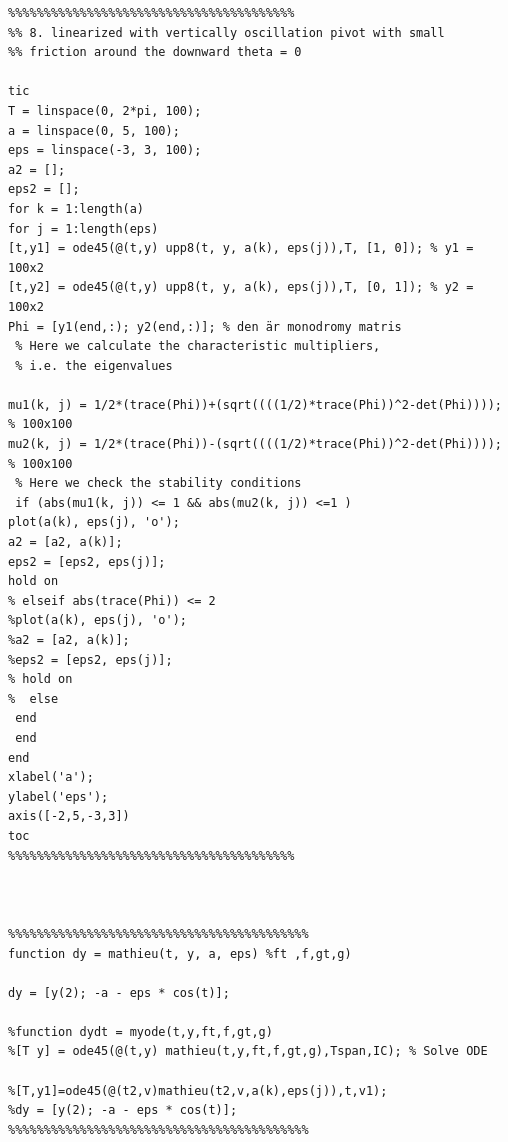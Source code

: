 \documentclass{article}
\begin{document}
\begin{verbatim}
%%%%%%%%%%%%%%%%%%%%%%%%%%%%%%%%%%%%%%%%
%% 8. linearized with vertically oscillation pivot with small 
%% friction around the downward theta = 0

tic
T = linspace(0, 2*pi, 100);
a = linspace(0, 5, 100);
eps = linspace(-3, 3, 100);
a2 = [];
eps2 = [];
for k = 1:length(a)
for j = 1:length(eps)
[t,y1] = ode45(@(t,y) upp8(t, y, a(k), eps(j)),T, [1, 0]); % y1 = 100x2
[t,y2] = ode45(@(t,y) upp8(t, y, a(k), eps(j)),T, [0, 1]); % y2 = 100x2
Phi = [y1(end,:); y2(end,:)]; % den är monodromy matris
 % Here we calculate the characteristic multipliers,
 % i.e. the eigenvalues
 
mu1(k, j) = 1/2*(trace(Phi))+(sqrt((((1/2)*trace(Phi))^2-det(Phi)))); % 100x100
mu2(k, j) = 1/2*(trace(Phi))-(sqrt((((1/2)*trace(Phi))^2-det(Phi)))); % 100x100
 % Here we check the stability conditions
 if (abs(mu1(k, j)) <= 1 && abs(mu2(k, j)) <=1 )
plot(a(k), eps(j), 'o');
a2 = [a2, a(k)];
eps2 = [eps2, eps(j)];
hold on
% elseif abs(trace(Phi)) <= 2
%plot(a(k), eps(j), 'o');
%a2 = [a2, a(k)];
%eps2 = [eps2, eps(j)];
% hold on
%  else
 end
 end
end
xlabel('a');
ylabel('eps');
axis([-2,5,-3,3])
toc
%%%%%%%%%%%%%%%%%%%%%%%%%%%%%%%%%%%%%%%%



%%%%%%%%%%%%%%%%%%%%%%%%%%%%%%%%%%%%%%%%%%
function dy = mathieu(t, y, a, eps) %ft ,f,gt,g)

dy = [y(2); -a - eps * cos(t)];

%function dydt = myode(t,y,ft,f,gt,g)
%[T y] = ode45(@(t,y) mathieu(t,y,ft,f,gt,g),Tspan,IC); % Solve ODE

%[T,y1]=ode45(@(t2,v)mathieu(t2,v,a(k),eps(j)),t,v1);
%dy = [y(2); -a - eps * cos(t)];
%%%%%%%%%%%%%%%%%%%%%%%%%%%%%%%%%%%%%%%%%%
\end{verbatim}

\tableofcontents
\end{document}
